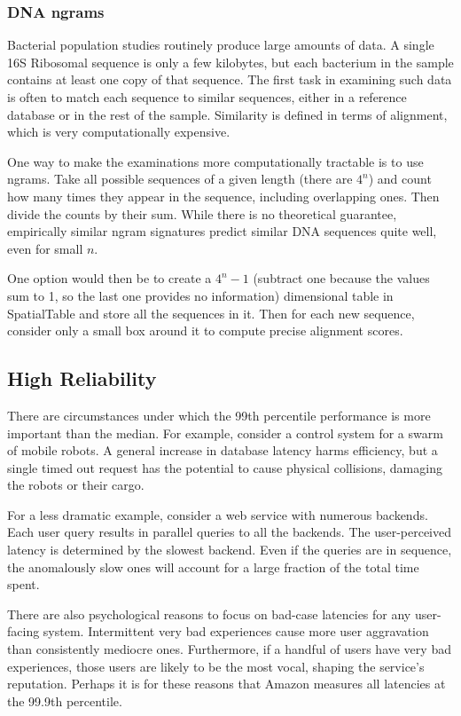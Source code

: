 \documentclass[11pt]{article}
\begin{document}
\subsubsection{DNA ngrams}

Bacterial population studies routinely produce large amounts of data.  A single 16S Ribosomal sequence is only a few kilobytes, but each bacterium in the sample contains at least one copy of that sequence.  The first task in examining such data is often to match each sequence to similar sequences, either in a reference database or in the rest of the sample.  Similarity is defined in terms of alignment, which is very computationally expensive.

One way to make the examinations more computationally tractable is to use ngrams.  Take all possible sequences of a given length (there are $4^n$) and count how many times they appear in the sequence, including overlapping ones.  Then divide the counts by their sum.  While there is no theoretical guarantee, empirically similar ngram signatures predict similar DNA sequences quite well, even for small $n$.\cite{dna}

One option would then be to create a $4^n-1$ (subtract one because the values sum to 1, so the last one provides no information) dimensional table in SpatialTable and store all the sequences in it.  Then for each new sequence, consider only a small box around it to compute precise alignment scores.

\subsection{High Reliability}

There are circumstances under which the 99th percentile performance is more important than the median.  For example, consider a control system for a swarm of mobile robots. A general increase in database latency harms efficiency, but a single timed out request has the potential to cause physical collisions, damaging the robots or their cargo.  

For a less dramatic example, consider a web service with numerous backends.  Each user query results in parallel queries to all the backends.  The user-perceived latency is determined by the slowest backend.  Even if the queries are in sequence, the anomalously slow ones will account for a large fraction of the total time spent.

There are also psychological reasons to focus on bad-case latencies for any user-facing system.  Intermittent very bad experiences cause more user aggravation than consistently mediocre ones.\cite{psych}  Furthermore, if a handful of users have very bad experiences, those users are likely to be the most vocal, shaping the service's reputation.  Perhaps it is for these reasons that Amazon measures all latencies at the 99.9th percentile\cite{amazon}.
\end{document}

